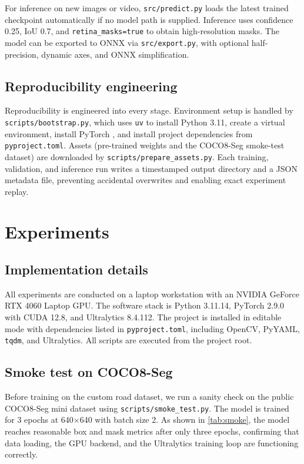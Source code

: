 \documentclass[11pt,a4paper]{article}
\newcommand{\tool}[1]{\texttt{#1}}
\begin{document}
For inference on new images or video, \tool{src/predict.py} loads the latest trained checkpoint automatically if no model path is supplied. Inference uses confidence 0.25, IoU 0.7, and \tool{retina\_masks=true} to obtain high-resolution masks. The model can be exported to ONNX via \tool{src/export.py}, with optional half-precision, dynamic axes, and ONNX simplification.

\subsection{Reproducibility engineering}

Reproducibility is engineered into every stage. Environment setup is handled by \tool{scripts/bootstrap.py}, which uses \tool{uv} \cite{Astral2024uv} to install Python 3.11, create a virtual environment, install PyTorch \cite{Paszke2019PyTorch}, and install project dependencies from \tool{pyproject.toml}. Assets (pre-trained weights and the COCO8-Seg smoke-test dataset) are downloaded by \tool{scripts/prepare\_assets.py}. Each training, validation, and inference run writes a timestamped output directory and a JSON metadata file, preventing accidental overwrites and enabling exact experiment replay.

\section{Experiments}\label{sec:experiments}

\subsection{Implementation details}

All experiments are conducted on a laptop workstation with an NVIDIA GeForce RTX 4060 Laptop GPU. The software stack is Python 3.11.14, PyTorch 2.9.0 with CUDA 12.8, and Ultralytics 8.4.112. The project is installed in editable mode with dependencies listed in \tool{pyproject.toml}, including OpenCV, PyYAML, \tool{tqdm}, and Ultralytics. All scripts are executed from the project root.

\subsection{Smoke test on COCO8-Seg}

Before training on the custom road dataset, we run a sanity check on the public COCO8-Seg mini dataset using \tool{scripts/smoke\_test.py}. The model is trained for 3 epochs at 640$\times$640 with batch size 2. As shown in \cref{tab:smoke}, the model reaches reasonable box and mask metrics after only three epochs, confirming that data loading, the GPU backend, and the Ultralytics training loop are functioning correctly.
\end{document}
